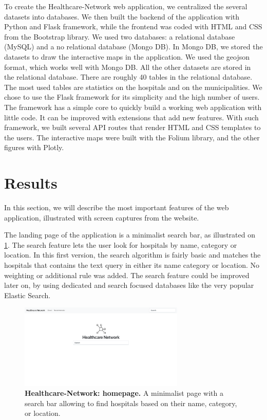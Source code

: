 To create the Healthcare-Network web application, we centralized the several
datasets into databases. We then built the backend of the application with
Python and Flask framework, while the frontend was coded with HTML and CSS from
the Bootstrap library. We used two databases: a relational database (MySQL) and
a no relational database (Mongo DB). In Mongo DB, we stored the datasets to draw
the interactive maps in the application. We used the geojson format, which works
well with Mongo DB. All the other datasets are stored in the relational
database. There are roughly 40 tables in the relational database. The most used
tables are statistics on the hospitals and on the municipalities. We chose to
use the Flask framework for its simplicity and the high number of users. The
framework has a simple core to quickly build a working web application with
little code. It can be improved with extensions that add new features. With such
framework, we built several API routes that render HTML and CSS templates to the
users. The interactive maps were built with the Folium library, and the other
figures with Plotly.

\section{Results}

In this section, we will describe the most important features of the web
application, illustrated with screen captures from the website.

The landing page of the application is a minimalist search bar, as illustrated
on \cref{fig:hn-home}. The search feature lets the user look for hospitals by
name, category or location. In this first version, the search algorithm is
fairly basic and matches the hospitals that contains the text query in either
its name category or location. No weighting or additional rule was added. The
search feature could be improved later on, by using dedicated and search focused
databases like the very popular Elastic Search.

\begin{figure}[H]
    \includegraphics[width=0.7\textwidth]{images/healthcare-network/home.png}
    \centering
    \caption{ \textbf{Healthcare-Network: homepage.} A minimalist page with a
        search bar allowing to find hospitals based on their name, category, or
        location. }
    \label{fig:hn-home}
\end{figure}

